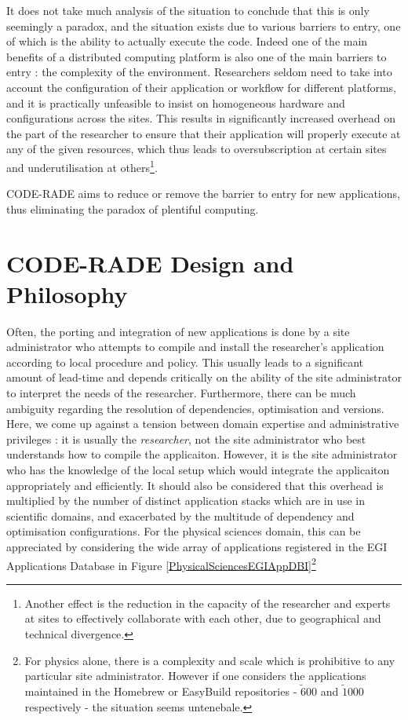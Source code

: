 \documentclass[a4paper]{jpconf}
\begin{document}
It does not take much analysis of the situation to conclude that this is only seemingly a paradox, and the situation exists due to various barriers to entry, one of which is the ability to actually execute the code. Indeed one of the main benefits of a distributed computing platform is also one of the main barriers to entry : the complexity of the environment. Researchers seldom need to take into account the configuration of their application or workflow for different platforms, and it is practically unfeasible to insist on homogeneous hardware and configurations across the sites. This results in significantly increased overhead on the part of the researcher to ensure that their application will properly execute at any of the given resources, which thus leads to oversubscription at certain sites and underutilisation at others\footnote{Another effect is the reduction in the capacity of the researcher and experts at sites to effectively collaborate with each other, due to geographical and technical divergence.}.

CODE-RADE aims to reduce or remove the barrier to entry for new applications, thus eliminating the paradox of plentiful computing.

\section{CODE-RADE Design and Philosophy}

Often, the porting and integration of new applications is done by a site administrator who attempts to compile and install the researcher's application according to local procedure and policy. This usually leads to a significant amount of lead-time and depends critically on the ability of the site administrator to interpret the needs of the researcher. Furthermore, there can be much ambiguity regarding the resolution of dependencies, optimisation and versions. Here, we come up against a tension between domain expertise and administrative privileges : it is usually the {\it researcher}, not the site administrator who best understands how to compile the applicaiton. However, it is the site administrator who has the knowledge of the local setup which would integrate the applicaiton appropriately and efficiently. It should also be considered that this overhead is multiplied by the number of distinct application stacks which are in use in scientific domains, and exacerbated by the multitude of dependency and optimisation configurations. For the physical sciences domain, this can be appreciated by considering the wide array of applications registered in the EGI Applications Database\cite{EGIAppDB} in Figure \ref{PhysicalSciencesEGIAppDBI}\footnote{For physics alone, there is a complexity and scale which is prohibitive to any particular site administrator. However if one considers the applications maintained in the Homebrew or EasyBuild repositories - $\tilde 600$ and $\tilde 1000$ respectively - the situation seems untenebale.}
\end{document}
